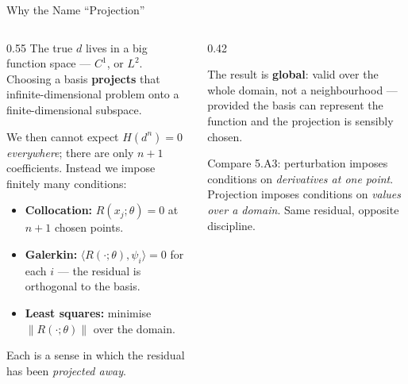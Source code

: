 \begin{frame}{Why the Name ``Projection''}
\begin{columns}[T]
\begin{column}{0.55\textwidth}
\small
The true $d$ lives in a big function space --- $C^{1}$, or $L^{2}$. Choosing a basis \textbf{projects} that infinite-dimensional problem onto a finite-dimensional subspace.
\medskip

We then cannot expect $H(d^{n})=0$ \emph{everywhere}; there are only $n+1$ coefficients. Instead we impose finitely many conditions:
\medskip
\begin{itemize}\small
  \item \textbf{Collocation:} $R(x_j;\theta)=0$ at $n+1$ chosen points.
  \item \textbf{Galerkin:} $\langle R(\cdot;\theta),\psi_i\rangle=0$ for each $i$ --- the residual is orthogonal to the basis.
  \item \textbf{Least squares:} minimise $\|R(\cdot;\theta)\|$ over the domain.
\end{itemize}
\medskip
Each is a sense in which the residual has been \emph{projected away}.
\end{column}
\begin{column}{0.42\textwidth}
\begin{takeawaybox}\footnotesize
The result is \textbf{global}: valid over the whole domain, not a neighbourhood --- provided the basis can represent the function and the projection is sensibly chosen.
\end{takeawaybox}
\medskip
\begin{examplebox}\footnotesize
Compare 5.A3: perturbation imposes conditions on \emph{derivatives at one point}. Projection imposes conditions on \emph{values over a domain}. Same residual, opposite discipline.
\end{examplebox}
\end{column}
\end{columns}
\vspace{1mm}
\end{frame}

